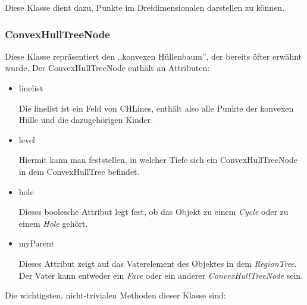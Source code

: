 Diese Klasse dient dazu, Punkte im Dreidimensionalen darstellen zu können.

\subsubsection{ConvexHullTreeNode}

Diese Klasse repräsentiert den ,,konvexen Hüllenbaum'', der bereits öfter erwähnt wurde. Der ConvexHullTreeNode enthält an Attributen:

\begin{itemize}
\item linelist

Die linelist ist ein Feld von CHLines, enthält also alle Punkte der konvexen Hülle und die dazugehörigen Kinder.

\item level

Hiermit kann man feststellen, in welcher Tiefe sich ein ConvexHullTreeNode in dem ConvexHullTree befindet.

\item hole

Dieses boolesche Attribut legt fest, ob das Objekt zu einem \textit{Cycle} oder zu einem \textit{Hole} gehört.

\item myParent

Dieses Attribut zeigt auf das Vaterelement des Objektes in dem \textit{RegionTree}. Der Vater kann entweder ein \textit{Face} oder ein anderer \textit{ConvexHullTreeNode} sein.

\end{itemize}

Die wichtigsten, nicht-trivialen Methoden dieser Klasse sind:

